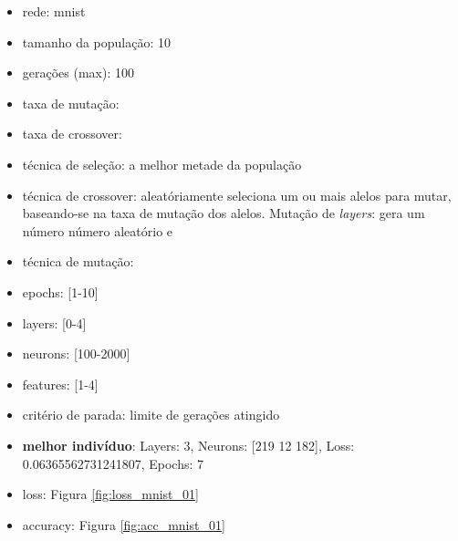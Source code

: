 \documentclass[twoside,conference,a4paper]{IEEEtran}
\begin{document}
\begin{itemize}
    \item rede: mnist
    \item tamanho da população: 10
    \item gerações (max): 100
    \item taxa de mutação:
    \item taxa de crossover:
    \item técnica de seleção: a melhor metade da população
    \item técnica de crossover: aleatóriamente seleciona um ou mais alelos para mutar, baseando-se na taxa de mutação dos alelos. Mutação de \emph{layers}: gera um número número aleatório e 
    \item técnica de mutação:
    \item epochs: [1-10]
    \item layers: [0-4]
    \item neurons: [100-2000]
    \item features: [1-4]
    \item critério de parada: limite de gerações atingido
    \item \textbf{melhor indivíduo}: Layers: 3, Neurons: [219  12 182], Loss: 0.06365562731241807, Epochs: 7
    \item loss: Figura \ref{fig:loss_mnist_01}
    \item accuracy: Figura \ref{fig:acc_mnist_01}
\end{itemize}
\end{document}
